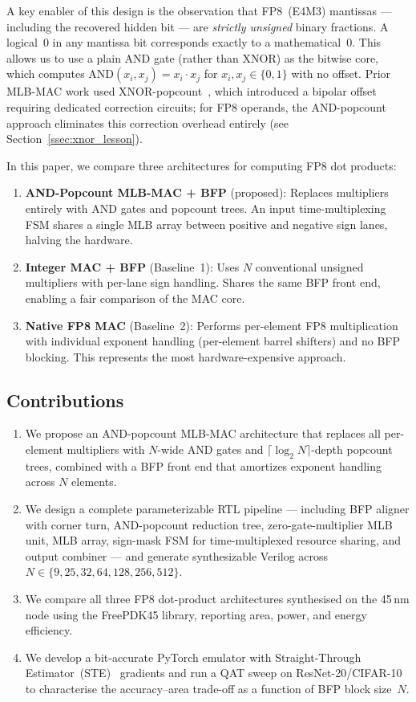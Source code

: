 \documentclass[conference]{IEEEtran}
\begin{document}
A key enabler of this design is the observation that FP8~(E4M3)
mantissas --- including the recovered hidden bit --- are \emph{strictly
unsigned} binary fractions.  A logical~0 in any mantissa bit
corresponds exactly to a mathematical~0.  This allows us to use a
plain AND gate (rather than XNOR) as the bitwise core, which
computes $\text{AND}(x_i, x_j) = x_i \cdot x_j$ for
$x_i, x_j \in \{0,1\}$ with no offset.  Prior MLB-MAC work used
XNOR-popcount~\cite{b1}, which introduced a bipolar offset
requiring dedicated correction circuits; for FP8 operands, the
AND-popcount approach eliminates this correction overhead entirely
(see Section~\ref{ssec:xnor_lesson}).

In this paper, we compare three architectures for computing FP8
dot products:
\begin{enumerate}
    \item \textbf{AND-Popcount MLB-MAC + BFP} (proposed):
    Replaces multipliers entirely with AND gates and popcount trees.
    An input time-multiplexing FSM shares a single MLB array
    between positive and negative sign lanes, halving the hardware.
    \item \textbf{Integer MAC + BFP} (Baseline~1):
    Uses $N$ conventional unsigned multipliers with per-lane sign
    handling. Shares the same BFP front end, enabling a fair
    comparison of the MAC core.
    \item \textbf{Native FP8 MAC} (Baseline~2):
    Performs per-element FP8 multiplication with individual exponent
    handling (per-element barrel shifters) and no BFP blocking.  This
    represents the most hardware-expensive approach.
\end{enumerate}

\subsection*{Contributions}
\begin{enumerate}
    \item We propose an AND-popcount MLB-MAC architecture that replaces
    all per-element multipliers with $N$-wide AND gates and
    $\lceil\log_2 N\rceil$-depth popcount trees, combined with a
    BFP front end that amortizes exponent handling across $N$
    elements.
    \item We design a complete parameterizable RTL pipeline ---
    including BFP aligner with corner turn, AND-popcount reduction
    tree, zero-gate-multiplier MLB unit, MLB array, sign-mask FSM
    for time-multiplexed resource sharing, and output combiner ---
    and generate synthesizable Verilog across
    $N \in \{9, 25, 32, 64, 128, 256, 512\}$.
    \item We compare all three FP8 dot-product architectures
    synthesised on the 45\,nm node using the FreePDK45 library,
    reporting area, power, and energy efficiency.
    \item We develop a bit-accurate PyTorch emulator with
    Straight-Through Estimator~(STE)~\cite{b_ste} gradients and
    run a QAT sweep on ResNet-20/CIFAR-10 to characterise the
    accuracy--area trade-off as a function of BFP block size~$N$.
\end{enumerate}
\end{document}
